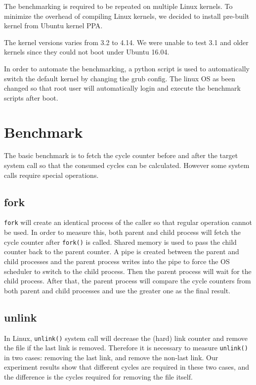 \documentclass{article}
\begin{document}
The benchmarking is required to be repeated on multiple Linux kernels.
To minimize the overhead of compiling Linux kernels,
we decided to install pre-built kernel from Ubuntu kernel PPA\cite{kernelppa}. 

The kernel versions varies from 3.2 to 4.14. We were unable to test 3.1 and older kernels since they could not boot under Ubuntu 16.04.

In order to automate the benchmarking, a python script is used to automatically switch the default kernel by changing the grub config.
The linux OS as been changed so that root user will automatically login and execute the benchmark scripts after boot.


\section{Benchmark}

The basic benchmark is to fetch the cycle counter before and after the target system call so that the consumed cycles can be calculated.
However some system calls require special operations.

\subsection{fork}

\lstinline{fork} will create an identical process of the caller so that regular operation cannot be used.
In order to measure this, both parent and child process will fetch the cycle counter after \lstinline{fork()} is called.
Shared memory is used to pass the child counter back to the parent counter.
A pipe is created between the parent and child processes and the parent process writes into the pipe to force
the OS scheduler to switch to the child process. Then the parent process will wait for the child process.
After that, the parent process will compare the cycle counters from both parent and child processes
and use the greater one as the final result.

\subsection{unlink}

In Linux, \lstinline{unlink()} system call will decrease the (hard) link counter and remove the file if the last link is removed.
Therefore it is necessary to measure \lstinline{unlink()} in two cases: removing the last link, and remove the non-last link.
Our experiment results show that different cycles are required in these two cases, and the difference is the cycles required for removing the file itself.
\end{document}
